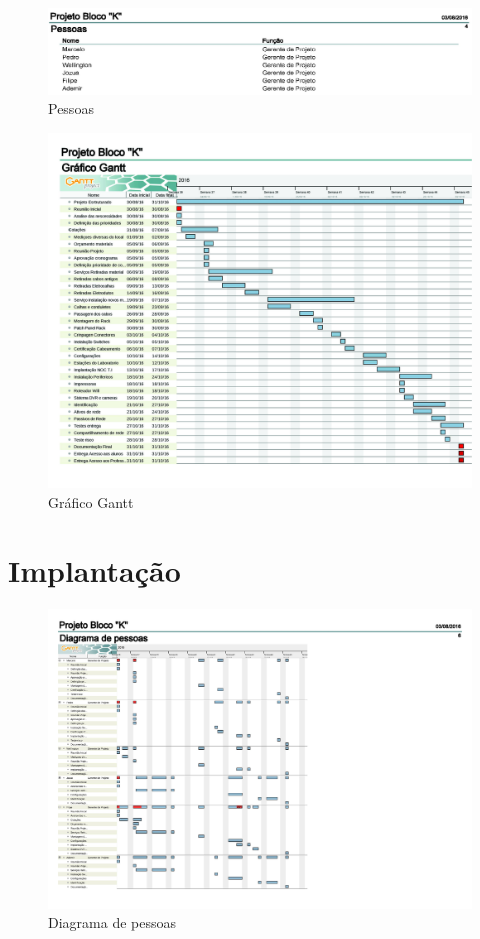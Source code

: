 \documentclass[	DIV=calc,%
paper=a4,%
fontsize=12pt,%
onecolumn]{scrartcl}	 					%
\begin{document}
	\begin{figure}[!h]
		\centering
		\caption{Pessoas}
		\includegraphics{a4}
	\end{figure}
	\begin{figure}[!h]
		\centering
		\caption{Gráfico Gantt}
		\includegraphics{c1}
	\end{figure}
	\section{Implantação}
	\begin{figure}[!h]
		\centering
		\caption{Diagrama de pessoas}
		\includegraphics{c2}
	\end{figure}
\end{document}
